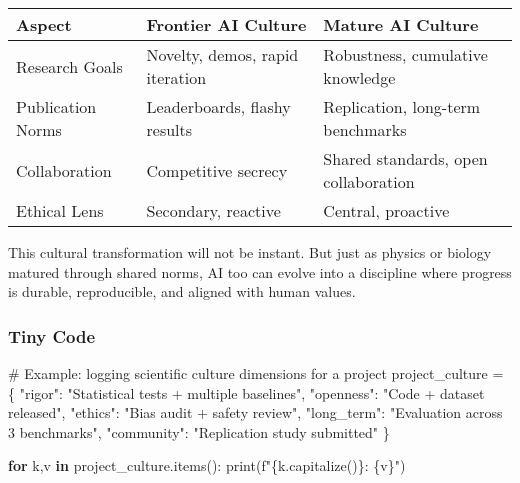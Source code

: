 \documentclass[
  letterpaper,
  DIV=11,
  numbers=noendperiod]{scrreprt}
\newenvironment{Shaded}{\begin{snugshade}}{\end{snugshade}}
\newcommand{\BuiltInTok}[1]{\textcolor[rgb]{0.00,0.23,0.31}{#1}}
\newcommand{\CommentTok}[1]{\textcolor[rgb]{0.37,0.37,0.37}{#1}}
\newcommand{\ControlFlowTok}[1]{\textcolor[rgb]{0.00,0.23,0.31}{\textbf{#1}}}
\newcommand{\KeywordTok}[1]{\textcolor[rgb]{0.00,0.23,0.31}{\textbf{#1}}}
\newcommand{\NormalTok}[1]{\textcolor[rgb]{0.00,0.23,0.31}{#1}}
\newcommand{\OperatorTok}[1]{\textcolor[rgb]{0.37,0.37,0.37}{#1}}
\newcommand{\SpecialCharTok}[1]{\textcolor[rgb]{0.37,0.37,0.37}{#1}}
\newcommand{\SpecialStringTok}[1]{\textcolor[rgb]{0.13,0.47,0.30}{#1}}
\newcommand{\StringTok}[1]{\textcolor[rgb]{0.13,0.47,0.30}{#1}}
\begin{document}
\begin{longtable}[]{@{}
  >{\raggedright\arraybackslash}p{}
  >{\raggedright\arraybackslash}p{}
  >{\raggedright\arraybackslash}p{}@{}}
\toprule\noalign{}
\begin{minipage}[b]{\linewidth}\raggedright
Aspect
\end{minipage} & \begin{minipage}[b]{\linewidth}\raggedright
Frontier AI Culture
\end{minipage} & \begin{minipage}[b]{\linewidth}\raggedright
Mature AI Culture
\end{minipage} \\
\midrule\noalign{}
\endhead
\bottomrule\noalign{}
\endlastfoot
Research Goals & Novelty, demos, rapid iteration & Robustness,
cumulative knowledge \\
Publication Norms & Leaderboards, flashy results & Replication,
long-term benchmarks \\
Collaboration & Competitive secrecy & Shared standards, open
collaboration \\
Ethical Lens & Secondary, reactive & Central, proactive \\
\end{longtable}

This cultural transformation will not be instant. But just as physics or
biology matured through shared norms, AI too can evolve into a
discipline where progress is durable, reproducible, and aligned with
human values.

\subsubsection{Tiny Code}\label{tiny-code-99}

\begin{Shaded}
\begin{Highlighting}[]
\CommentTok{\# Example: logging scientific culture dimensions for a project}
\NormalTok{project\_culture }\OperatorTok{=}\NormalTok{ \{}
    \StringTok{"rigor"}\NormalTok{: }\StringTok{"Statistical tests + multiple baselines"}\NormalTok{,}
    \StringTok{"openness"}\NormalTok{: }\StringTok{"Code + dataset released"}\NormalTok{,}
    \StringTok{"ethics"}\NormalTok{: }\StringTok{"Bias audit + safety review"}\NormalTok{,}
    \StringTok{"long\_term"}\NormalTok{: }\StringTok{"Evaluation across 3 benchmarks"}\NormalTok{,}
    \StringTok{"community"}\NormalTok{: }\StringTok{"Replication study submitted"}
\NormalTok{\}}

\ControlFlowTok{for}\NormalTok{ k,v }\KeywordTok{in}\NormalTok{ project\_culture.items():}
    \BuiltInTok{print}\NormalTok{(}\SpecialStringTok{f"}\SpecialCharTok{\{}\NormalTok{k}\SpecialCharTok{.}\NormalTok{capitalize()}\SpecialCharTok{\}}\SpecialStringTok{: }\SpecialCharTok{\{}\NormalTok{v}\SpecialCharTok{\}}\SpecialStringTok{"}\NormalTok{)}
\end{Highlighting}
\end{Shaded}
\end{document}
